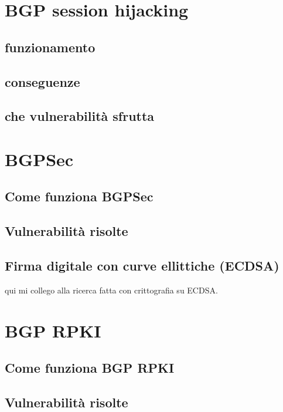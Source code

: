 \documentclass[12pt,a4paper,twoside]{book}
\begin{document}
\section{BGP session hijacking}

\subsection{funzionamento}

\subsection{conseguenze}

\subsection{che vulnerabilità sfrutta}

\section{BGPSec}

\subsection{Come funziona BGPSec}

\subsection{Vulnerabilità risolte}

\subsection{Firma digitale con curve ellittiche (ECDSA)}
qui mi collego alla ricerca fatta con crittografia su ECDSA.

\section{BGP RPKI}

\subsection{Come funziona BGP RPKI}

\subsection{Vulnerabilità risolte}
\end{document}
